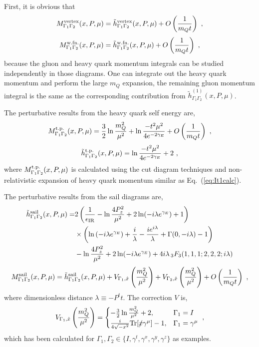 \documentclass[a4paper,11pt]{article}
\begin{document}
First, it is obvious that
\begin{align}
M^{\rm vertex}_{\Gamma_1 \Gamma_2}(x,P,\mu) =  \tilde{h}^{\rm vertex}_{\Gamma_1 \Gamma_2}(x,P,\mu) +O\left(\frac{1}{m_Q t}\right) \ ,
\end{align}
\begin{align}
M^{\rm w.fn.}_{\Gamma_1 \Gamma_2}(x,P,\mu) =  \tilde{h}^{\rm w.fn.}_{\Gamma_1 \Gamma_2}(x,P,\mu) +O\left(\frac{1}{m_Q t}\right)  \ ,
\end{align}
because the gluon and heavy quark momentum integrals can be studied independently in those diagrams. One can integrate out the heavy quark momentum and perform the large $m_Q$ expansion, the remaining gluon momentum integral is the same as the corresponding contribution from $\tilde{h}^{(1)}_{\Gamma_1 \Gamma_2}(x,P,\mu)$. 

The perturbative results from the heavy quark self energy are,
\begin{align}
M^{\rm t.p.}_{\Gamma_1 \Gamma_2}(x,P,\mu) = \frac{3}{2}\ln \frac{m_Q^2}{\mu^2} + \ln \frac{-t^2 \mu^2}{4 e^{-2\gamma_E}}  +O\left(\frac{1}{m_Q t}\right)  \ ,
\end{align}
\begin{align}
\tilde{h}^{\rm t.p.}_{\Gamma_1 \Gamma_2}(x,P,\mu) = \ln \frac{-t^2 \mu^2}{4 e^{-2\gamma_E}} + 2   \ , 
\end{align}
where $M^{\rm t.p.}_{\Gamma_1 \Gamma_2}(x,P,\mu)$ is calculated using the cut diagram techniques and non-relativistic expansion of heavy quark momentum similar as Eq.~(\ref{eq:It1calc}).

The perturbative results from the sail diagrams are,
\begin{align}
\tilde{h}^{\rm sail}_{\Gamma_1 \Gamma_2}(x,P,\mu) 
= &   2 \left(\frac{1}{\epsilon_{\rm IR}} - \ln\frac{4P_z^2}{\mu^2} + 2\ln(-i \lambda e^{\gamma_E}) + 1 \right)  \nonumber\\
& \times \left(\ln \left(-i \lambda  e^{\gamma_E }\right)+\frac{i}{\lambda}-\frac{i e^{i \lambda }}{\lambda }+\Gamma (0,-i \lambda )-1\right) \nonumber\\
& - \ln\frac{4P_z^2}{\mu^2} + 2\ln(-i \lambda  e^{\gamma_E }) + 4 i \lambda  \, _3F_3(1,1,1;2,2,2;i \lambda ) 
\end{align}
\begin{align}
M^{\rm sail}_{\Gamma_1 \Gamma_2}(x,P,\mu) =  \tilde{h}^{\rm sail}_{\Gamma_1 \Gamma_2}(x,P,\mu) + V_{\Gamma_1,\hat{x}}\left(\frac{m_Q^2}{\mu^2}\right) + V_{\Gamma_2,\hat{x}}\left(\frac{m_Q^2}{\mu^2}\right) +O\left(\frac{1}{m_Q t}\right) \ ,
\end{align}
where dimensionless distance $\lambda \equiv - P^t t$. The correction $V$ is,
\begin{align}
V_{\Gamma_1,\hat{x}}\left(\frac{m_Q^2}{\mu^2}\right)   = \begin{cases}
-\frac{3}{2} \ln\frac{m_Q^2}{\mu^2} + 2, &\Gamma_1 = I \\
\frac{i}{4\sqrt{-x^2}}{\rm Tr}[\slashed{x} \gamma^{\mu}] - 1, &\Gamma_1 = \gamma^{\mu} 
\end{cases} \ ,
\end{align}
which has been calculated for $\Gamma_1,\Gamma_2 \in \{I,\gamma^t,\gamma^x,\gamma^y,\gamma^z\}$ as examples. 
\end{document}
